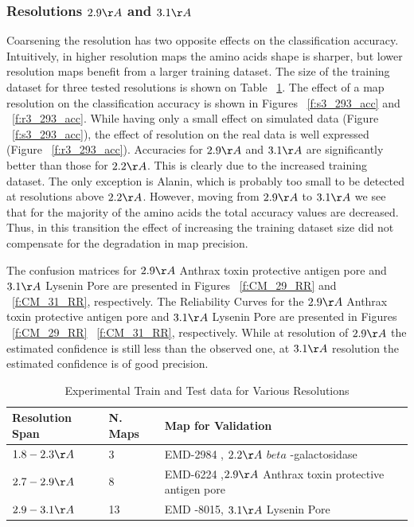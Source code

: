 \subsubsection{Resolutions $2.9 \AA$ and   $3.1 \AA$ }
Coarsening the resolution has two opposite effects on the classification accuracy.
Intuitively, in higher resolution maps the amino acids shape is sharper, but lower resolution maps benefit from a larger training dataset.
The size of the training dataset for three tested resolutions is shown on Table ~\ref{t0}.
The effect of a map resolution on the classification accuracy is shown in Figures ~\ref{f:s3_293_acc} and ~\ref{f:r3_293_acc}.
While having only a small effect on simulated data (Figure ~\ref{f:s3_293_acc}), the effect of resolution on the real data is well expressed (Figure ~\ref{f:r3_293_acc}).
 Accuracies for $2.9 \AA$ and $3.1 \AA$ are significantly better than those for $2.2 \AA$. This is clearly due to the increased training dataset. 
 The only exception is Alanin, which is probably too small to be detected at resolutions above $2.2 \AA$.
However, moving from $2.9 \AA$ to $3.1 \AA$ we see that for the majority of the amino acids the total accuracy values are decreased.  Thus, in this transition the effect of increasing the training dataset size did not compensate for the degradation in map precision.
 
The confusion matrices for $2.9 \AA$ Anthrax toxin protective antigen pore and $3.1 \AA $ Lysenin Pore are presented in Figures ~\ref{f:CM_29_RR} and ~\ref{f:CM_31_RR}, respectively. The Reliability Curves for the $2.9 \AA$ Anthrax toxin protective antigen pore and $3.1 \AA $ Lysenin Pore are presented in Figures ~\ref{f:CM_29_RR} ~\ref{f:CM_31_RR}, respectively.
 While at resolution of $2.9 \AA$ the estimated confidence is still less than the observed one, at $3.1 \AA$ resolution the estimated confidence is of good precision.
 
\begin{table}
\small
\begin{tabular}{ | m{5em} | m{1cm} | m{3cm}| }
\hline
 Resolution Span & N. Maps  & Map for Validation \\
\hline
 $1.8-2.3 \AA$  & 3  & EMD-2984 , $2.2 \AA$ $beta$ -galactosidase \cite[]{Banerjee20162.3Inhibition} \\
\hline
 $2.7-2.9 \AA$  & 8  & EMD-6224 ,$2.9 \AA$  Anthrax toxin protective antigen pore \cite[]{jiang2015atomic} \\
\hline
 $2.9-3.1 \AA$  & 13  & EMD -8015, $3.1 \AA$ Lysenin Pore \cite[]{Bokori-Brown2016Cryo-EMProtein} \\
\hline
 \end{tabular}
\caption{Experimental Train and Test data for Various Resolutions}\label{t0}
\end{table}

